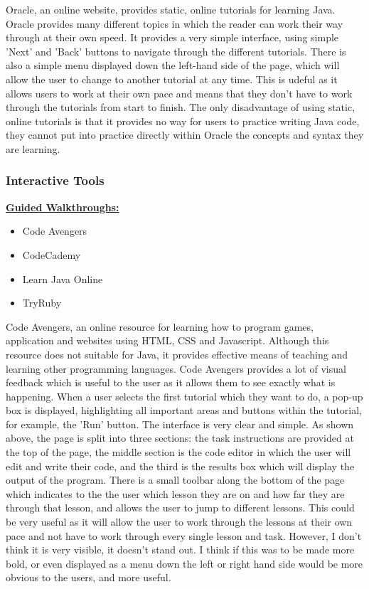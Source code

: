 \documentclass{article}
\begin{document}
Oracle, an online website, provides static, online tutorials for learning Java. Oracle provides many different topics in which the reader can work their way through at their own speed. It provides a very simple interface, using simple 'Next' and 'Back' buttons to navigate through the different tutorials. There is also a simple menu displayed down the left-hand side of the page, which will allow the user to change to another tutorial at any time. This is udeful as it allows users to work at their own pace and means that they don't have to work through the tutorials from start to finish. The only disadvantage of using static, online tutorials is that it provides no way for users to practice writing Java code, they cannot put into practice directly within Oracle the concepts and syntax they are learning.

\subsubsection{Interactive Tools}

\textbf{\underline{Guided Walkthroughs:}}\\

\begin{itemize}
\item Code Avengers
\item CodeCademy
\item Learn Java Online
\item TryRuby
\end{itemize}

Code Avengers, an online resource for learning how to program games, application and websites using HTML, CSS and Javascript. Although this resource does not suitable for Java, it provides effective means of teaching and learning other programming languages. Code Avengers provides a lot of visual feedback which is useful to the user as it allows them to see exactly what is happening. When a user selects the first tutorial which they want to do, a pop-up box is displayed, highlighting all important areas and buttons within the tutorial, for example, the 'Run' button.  The interface is very clear and simple. As shown above, the page is split into three sections: the task instructions are provided at the top of the page, the middle section is the code editor in which the user will edit and write their code, and the third is the results box which will display the output of the program. There is a small toolbar along the bottom of the page which indicates to the the user which lesson they are on and how far they are through that lesson, and allows the user to jump to different lessons. This could be very useful as it will allow the user to work through the lessons at their own pace and not have to work through every single lesson and task. However, I don't think it is very visible, it doesn't stand out. I think if this was to be made more bold, or even displayed as a menu down the left or right hand side would be more obvious to the users, and more useful.
\end{document}

